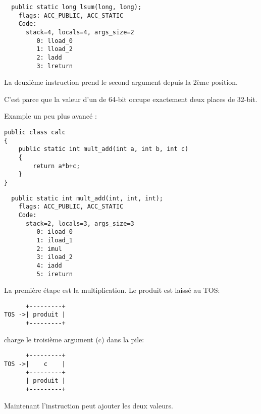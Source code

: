 \begin{lstlisting}
  public static long lsum(long, long);
    flags: ACC_PUBLIC, ACC_STATIC
    Code:
      stack=4, locals=4, args_size=2
         0: lload_0       
         1: lload_2       
         2: ladd          
         3: lreturn       
\end{lstlisting}

La deuxième instruction  prend le second argument depuis la 2ème position.

C'est parce que la valeur d'un  de 64-bit occupe exactement deux places de 32-bit.


Example un peu plus avancé :


\begin{lstlisting}[style=customjava]
public class calc
{
	public static int mult_add(int a, int b, int c)
	{
		return a*b+c;
	}
}
\end{lstlisting}

\begin{lstlisting}
  public static int mult_add(int, int, int);
    flags: ACC_PUBLIC, ACC_STATIC
    Code:
      stack=2, locals=3, args_size=3
         0: iload_0       
         1: iload_1       
         2: imul          
         3: iload_2       
         4: iadd          
         5: ireturn       
\end{lstlisting}

La première étape est la multiplication. Le produit est laissé au \ac{TOS}:


\begin{lstlisting}
      +---------+
TOS ->| produit |
      +---------+
\end{lstlisting}

 charge le troisième argument (c) dans la pile:

\begin{lstlisting}
      +---------+
TOS ->|    c    |
      +---------+
      | produit |
      +---------+
\end{lstlisting}

Maintenant l'instruction  peut ajouter les deux valeurs.

